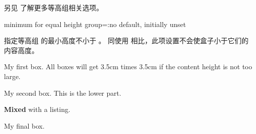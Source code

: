 \medskip
\begin{marker}
另见  了解更多等高组相关选项。
\end{marker}



\begin{docTcbKey}{minimum for equal height group}{=:}{no default, initially unset}

指定等高组  的最小高度不小于 。%
同使用  相比，此项设置不会使盒子小于它们的内容高度。
 
\begin{dispExample}

\begin{tcolorbox}
  My first box. All boxes will get 3.5cm times 3.5cm
  if the content height is not too large.
\end{tcolorbox}%
\begin{tcolorbox}
  My second box.
  \tcblower
  This is the lower part.
\end{tcolorbox}%
\begin{tcblisting}{}
\textbf{Mixed}
with a listing.
\end{tcblisting}
\begin{tcolorbox}[title={Fourth box}]
  My final box.
\end{tcolorbox}%
\end{dispExample}
\end{docTcbKey}

